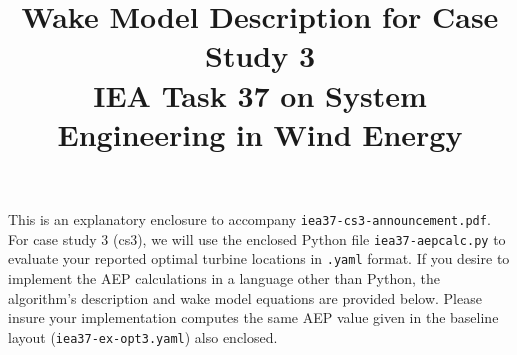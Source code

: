 \documentclass[10pt]{article}
\begin{document}
\title{Wake Model Description for Case Study 3\\
    \small{IEA Task 37 on System Engineering in Wind Energy}}
    \date{\vspace{-1.8cm}}
\setlength{\droptitle}{-5em}
\maketitle

This is an explanatory enclosure to accompany \texttt{iea37-cs3-announcement.pdf}.
For case study 3 (cs3), we will use the enclosed Python file \texttt{iea37-aepcalc.py} to evaluate your reported optimal turbine locations in \texttt{.yaml} format.
If you desire to implement the AEP calculations in a language other than Python, the algorithm's description and wake model equations are provided below.
Please insure your implementation computes the same AEP value given in the baseline layout (\texttt{iea37-ex-opt3.yaml}) also enclosed.
\end{document}

